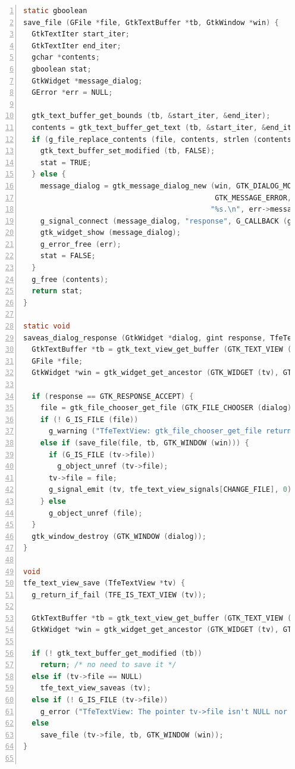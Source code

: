 \begin{lstlisting}[language=C, numbers=left]
static gboolean
save_file (GFile *file, GtkTextBuffer *tb, GtkWindow *win) {
  GtkTextIter start_iter;
  GtkTextIter end_iter;
  gchar *contents;
  gboolean stat;
  GtkWidget *message_dialog;
  GError *err = NULL;

  gtk_text_buffer_get_bounds (tb, &start_iter, &end_iter);
  contents = gtk_text_buffer_get_text (tb, &start_iter, &end_iter, FALSE);
  if (g_file_replace_contents (file, contents, strlen (contents), NULL, TRUE, G_FILE_CREATE_NONE, NULL, NULL, &err)) {
    gtk_text_buffer_set_modified (tb, FALSE);
    stat = TRUE;
  } else {
    message_dialog = gtk_message_dialog_new (win, GTK_DIALOG_MODAL,
                                             GTK_MESSAGE_ERROR, GTK_BUTTONS_CLOSE,
                                            "%s.\n", err->message);
    g_signal_connect (message_dialog, "response", G_CALLBACK (gtk_window_destroy), NULL);
    gtk_widget_show (message_dialog);
    g_error_free (err);
    stat = FALSE;
  }
  g_free (contents);
  return stat;
}

static void
saveas_dialog_response (GtkWidget *dialog, gint response, TfeTextView *tv) {
  GtkTextBuffer *tb = gtk_text_view_get_buffer (GTK_TEXT_VIEW (tv));
  GFile *file;
  GtkWidget *win = gtk_widget_get_ancestor (GTK_WIDGET (tv), GTK_TYPE_WINDOW);

  if (response == GTK_RESPONSE_ACCEPT) {
    file = gtk_file_chooser_get_file (GTK_FILE_CHOOSER (dialog));
    if (! G_IS_FILE (file))
      g_warning ("TfeTextView: gtk_file_chooser_get_file returns non GFile.\n");
    else if (save_file(file, tb, GTK_WINDOW (win))) {
      if (G_IS_FILE (tv->file))
        g_object_unref (tv->file);
      tv->file = file;
      g_signal_emit (tv, tfe_text_view_signals[CHANGE_FILE], 0);
    } else
      g_object_unref (file);
  }
  gtk_window_destroy (GTK_WINDOW (dialog));
}

void
tfe_text_view_save (TfeTextView *tv) {
  g_return_if_fail (TFE_IS_TEXT_VIEW (tv));

  GtkTextBuffer *tb = gtk_text_view_get_buffer (GTK_TEXT_VIEW (tv));
  GtkWidget *win = gtk_widget_get_ancestor (GTK_WIDGET (tv), GTK_TYPE_WINDOW);

  if (! gtk_text_buffer_get_modified (tb))
    return; /* no need to save it */
  else if (tv->file == NULL)
    tfe_text_view_saveas (tv);
  else if (! G_IS_FILE (tv->file))
    g_error ("TfeTextView: The pointer tv->file isn't NULL nor GFile.\n");
  else
    save_file (tv->file, tb, GTK_WINDOW (win));
}


\end{lstlisting}
